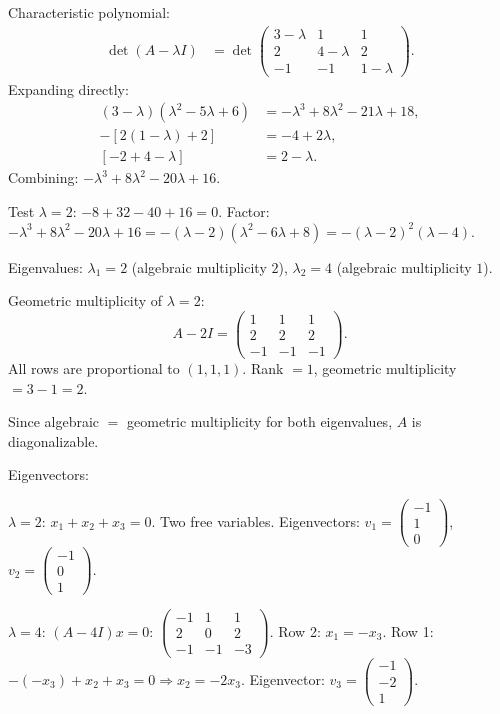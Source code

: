 \documentclass{article}
\begin{document}
\begin{mdframed}[linewidth=1pt]
\textnormal{Characteristic polynomial:}
\begin{align*}
\det(A - \lambda I) &= \det\begin{pmatrix} 3-\lambda & 1 & 1 \\ 2 & 4-\lambda & 2 \\ -1 & -1 & 1-\lambda \end{pmatrix}.
\end{align*}
Expanding directly:
\begin{align*}
(3-\lambda)(\lambda^2 - 5\lambda + 6) &= -\lambda^3 + 8\lambda^2 - 21\lambda + 18, \\
-[2(1-\lambda)+2] &= -4 + 2\lambda, \\
[-2 + 4 - \lambda] &= 2 - \lambda.
\end{align*}
Combining: $-\lambda^3 + 8\lambda^2 - 20\lambda + 16$.

Test $\lambda = 2$: $-8 + 32 - 40 + 16 = 0$.
Factor: $-\lambda^3 + 8\lambda^2 - 20\lambda + 16 = -(\lambda - 2)(\lambda^2 - 6\lambda + 8) = -(\lambda-2)^2(\lambda-4)$.

Eigenvalues: $\lambda_1 = 2$ (algebraic multiplicity $2$), $\lambda_2 = 4$ (algebraic multiplicity $1$).

\textnormal{Geometric multiplicity of $\lambda = 2$:}
\[
A - 2I = \begin{pmatrix} 1 & 1 & 1 \\ 2 & 2 & 2 \\ -1 & -1 & -1 \end{pmatrix}.
\]
All rows are proportional to $(1,1,1)$. Rank $= 1$, geometric multiplicity $= 3 - 1 = 2$.

Since algebraic $=$ geometric multiplicity for both eigenvalues, $A$ is \textnormal{diagonalizable}.

\textnormal{Eigenvectors:}

$\lambda = 2$: $x_1 + x_2 + x_3 = 0$. Two free variables. Eigenvectors: $v_1 = \begin{pmatrix} -1 \\ 1 \\ 0 \end{pmatrix}$, $v_2 = \begin{pmatrix} -1 \\ 0 \\ 1 \end{pmatrix}$.

$\lambda = 4$: $(A - 4I)x = 0$:
$\begin{pmatrix} -1 & 1 & 1 \\ 2 & 0 & 2 \\ -1 & -1 & -3 \end{pmatrix}$.
Row 2: $x_1 = -x_3$. Row 1: $-(-x_3) + x_2 + x_3 = 0 \Rightarrow x_2 = -2x_3$. Eigenvector: $v_3 = \begin{pmatrix} -1 \\ -2 \\ 1 \end{pmatrix}$.


\end{mdframed}
\end{document}
